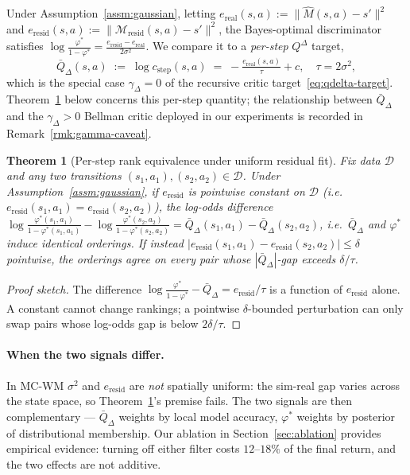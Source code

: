 \documentclass{article}
\newtheorem{theorem}{Theorem}
\theoremstyle{definition}
\newcommand{\Mresid}{\mathcal{M}_{\mathrm{resid}}}
\newcommand{\QD}{Q^{\Delta}}
\begin{document}
Under Assumption~\ref{assm:gaussian}, letting
$e_{\mathrm{real}}(s,a):=\|\hat M(s,a)-s'\|^2$ and
$e_{\mathrm{resid}}(s,a):=\|\Mresid(s,a)-s'\|^2$, the Bayes-optimal
discriminator satisfies
$\log\tfrac{\varphi^*}{1-\varphi^*}=\tfrac{e_{\mathrm{resid}}-e_{\mathrm{real}}}{2\sigma^2}$.
We compare it to a \emph{per-step} $\QD$ target,
\[
\bar Q_\Delta(s,a) \;:=\; \log c_{\mathrm{step}}(s,a) \;=\; -\tfrac{e_{\mathrm{real}}(s,a)}{\tau}+c,
\quad \tau=2\sigma^2,
\]
which is the special case $\gamma_\Delta=0$ of the recursive critic
target~\eqref{eq:qdelta-target}.  Theorem~\ref{thm:qdelta-icrl} below
concerns this per-step quantity; the relationship between $\bar Q_\Delta$
and the $\gamma_\Delta>0$ Bellman critic deployed in our experiments is
recorded in Remark~\ref{rmk:gamma-caveat}.

\begin{theorem}[Per-step rank equivalence under uniform residual fit]
\label{thm:qdelta-icrl}
Fix data $\mathcal D$ and any two transitions $(s_1,a_1),(s_2,a_2)\in\mathcal D$.
Under Assumption~\ref{assm:gaussian}, if $e_{\mathrm{resid}}$ is
\emph{pointwise constant} on $\mathcal D$ (i.e.\
$e_{\mathrm{resid}}(s_1,a_1)=e_{\mathrm{resid}}(s_2,a_2)$), the log-odds
difference
$\log\tfrac{\varphi^*(s_1,a_1)}{1-\varphi^*(s_1,a_1)} -
\log\tfrac{\varphi^*(s_2,a_2)}{1-\varphi^*(s_2,a_2)}
= \bar Q_\Delta(s_1,a_1)-\bar Q_\Delta(s_2,a_2)$,
i.e.\ $\bar Q_\Delta$ and $\varphi^*$ induce identical orderings.
If instead $|e_{\mathrm{resid}}(s_1,a_1)-e_{\mathrm{resid}}(s_2,a_2)|\le\delta$
pointwise, the orderings agree on every pair whose $|\bar Q_\Delta|$-gap
exceeds $\delta/\tau$.
\end{theorem}

\begin{proof}[Proof sketch]  The difference
$\log\tfrac{\varphi^*}{1-\varphi^*} - \bar Q_\Delta
= e_{\mathrm{resid}}/\tau$
is a function of $e_{\mathrm{resid}}$ alone.  A constant cannot change
rankings; a pointwise $\delta$-bounded perturbation can only swap pairs whose log-odds
gap is below $2\delta/\tau$.
\end{proof}

\paragraph{When the two signals differ.}  In MC-WM $\sigma^2$ and
$e_{\mathrm{resid}}$ are \emph{not} spatially uniform: the sim-real gap
varies across the state space, so Theorem~\ref{thm:qdelta-icrl}'s premise
fails.  The two signals are then complementary --- $\bar Q_\Delta$ weights by local
model accuracy, $\varphi^*$ weights by posterior of distributional
membership.  Our ablation in Section~\ref{sec:ablation} provides
empirical evidence: turning off either filter costs $12$--$18\%$ of the
final return, and the two effects are not additive.
\end{document}
